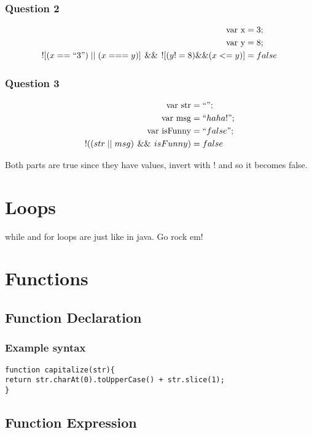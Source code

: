 \documentclass[11pt, a4paper]{article}   	%
\newcommand\tab[1][1cm]{\hspace*{#1}} %
\begin{document}
\subsubsection{Question 2}
	\begin{align*}
		\text{var x} &= 3;\\
		\text{var y} &= 8;\\
		![(x==``3")\mid\mid(x===y)] \hspace{4pt}\&\& \hspace{4pt} ![(y!=8) \&\& (x<=y)]  &= false
	\end{align*}
	
\subsubsection{Question 3}
	\begin{align*}
		\text{var str} &= ``";\\
		\text{var msg} &= ``haha!";\\
		\text{var isFunny} &= ``false";\\
		!((str \mid\mid msg) \hspace{4pt}\&\&\hspace{4pt} isFunny) &= false
	\end{align*}
	
	Both parts are true since they have values, invert with $!$ and so it becomes false.
	
\section{Loops}
while and for loops are just like in java. Go rock em!

\section{Functions}
\subsection{Function Declaration}
\subsubsection{Example syntax}
\texttt{function capitalize(str)\{ \\
\tab return str.charAt(0).toUpperCase() + str.slice(1); \\
\}
}
\subsection{Function Expression}
\end{document}
